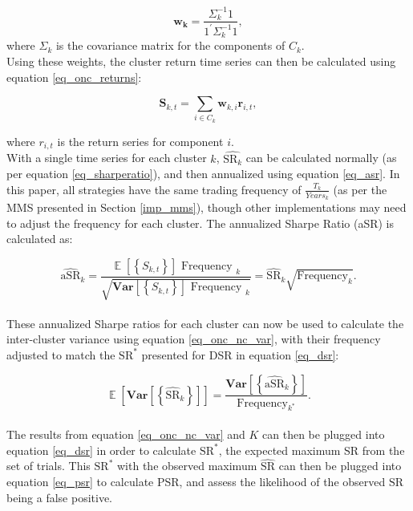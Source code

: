 \documentclass[a4paper,11pt,oneside]{article}
\newcommand{\Var}{\mathbf{Var}}
\DeclareMathOperator*{\E}{\mathbb{E}}
\theoremstyle{plain}
\theoremstyle{definition}
\begin{document}
	\begin{equation}\label{eq_onc_weights}
	\mathbf{w_{k}}=\frac{\Sigma_{k}^{-1} 1}{1^{\prime} \Sigma_{k}^{-1} 1}, 
	\end{equation}
		where $\Sigma_k$ is the covariance matrix for the components of $C_k$.\newline
	~\\
	Using these weights, the cluster return time series can then be calculated using equation \eqref{eq_onc_returns}:
	
	\begin{equation}\label{eq_onc_returns}
	\mathbf{S}_{k, t}=\sum_{i \in C_{k}} \mathbf{w}_{k, i} \mathbf{r}_{i, t} , 
	\end{equation}

	where $r_{i,t}$ is the return series for component $i$.\newline
	~\\
	With a single time series for each cluster $k$, $\widehat{\mathrm{SR}_k}$ can be calculated normally (as per equation \eqref{eq_sharperatio}), and then annualized using equation \eqref{eq_asr}. In this paper, all strategies have the same trading frequency of $\frac{T_k}{Years_k}$ (as per the MMS presented in Section \ref{imp_mms}), though other implementations may need to adjust the frequency for each cluster. The annualized Sharpe Ratio (aSR) is calculated as:
		
	\begin{equation}\label{eq_asr}
	\widehat{\mathrm{aSR}}_{k}=\frac{\mathrm{\E}\left[\left\{S_{k, t}\right\}\right] \text { Frequency }_{k}}{\sqrt{\mathrm{\Var}\left[\left\{S_{k, t}\right\}\right] \text { Frequency }_{k}}}=\widehat{\mathrm{SR}}_{k} \sqrt{\text {Frequency}_{k}} .
	\end{equation}
	~\\
	These annualized Sharpe ratios for each cluster can now be used to calculate the inter-cluster variance using equation \eqref{eq_onc_nc_var}, with their frequency adjusted to match the $\mathrm{SR}^*$ presented for DSR in equation \eqref{eq_dsr}:
		
	\begin{equation}\label{eq_onc_nc_var}
	\mathrm{\E}\left[\mathrm{\Var}\left[\left\{\widehat{\mathrm{SR}}_{k}\right\}\right]\right]=\frac{\mathrm{\Var}\left[\left\{\widehat{\mathrm{aSR}}_{k}\right\}\right]}{\text {Frequency}_{k^{*}}} .
	\end{equation}
	~\\
	The results from equation \eqref{eq_onc_nc_var} and $K$ can then be plugged into equation \eqref{eq_dsr} in order to calculate $\mathrm{SR}^*$, the expected maximum SR from the set of trials. This $\mathrm{SR}^*$ with the observed maximum $\widehat{\mathrm{SR}}$ can then be plugged into equation \eqref{eq_psr} to calculate PSR, and assess the likelihood of the observed $\widehat{\mathrm{SR}}$ being a false positive.
		
\end{document}

